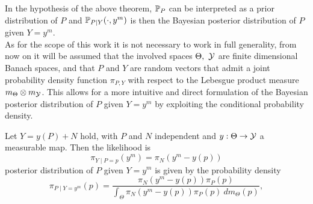 In the hypothesis of the above theorem, $\mathbb P_P$ can be interpreted as a prior distribution of $P$ and $\mathbb P_{P \mid Y}(\cdot, y^m)$ is then the Bayesian posterior distribution of $P$ given $Y=y^m$. \\

As for the scope of this work it is not necessary to work in full generality, from now on it will be assumed that the involved spaces $\Theta, \  \mathcal Y$ are finite dimensional Banach spaces, and that $P$ and $Y$ are random vectors that admit a joint probability density function $\pi_{P,Y}$ with respect to the Lebesgue product measure $m_\Theta \otimes m_\mathcal Y$. This allows for a more intuitive and direct formulation of the Bayesian posterior distribution of $P$ given $Y=y^m$ by exploiting the conditional probability density.

\begin{thm}
    Let $Y = y(P) + N$ hold, with $P$ and $N$ independent and $y: \Theta \rightarrow \mathcal Y$ a measurable map.
    Then the likelihood is \[
        \pi_{Y\mid P = p}(y^m) = \pi_{N}(y^m - y( p) )
    \] posterior distribution of $P$ given $Y=y^m$ is given by the probability density \begin{equation}\label{eq:Bayes}
        \pi_{P\mid Y = y^m}(p) = \frac{\pi_{N}(y^m - y( p) ) \pi_P(p)}{\int_\Theta  \pi_{N}(y^m - y( p) ) \pi_P(p) \ dm_\Theta(p)},
    \end{equation}
\end{thm}